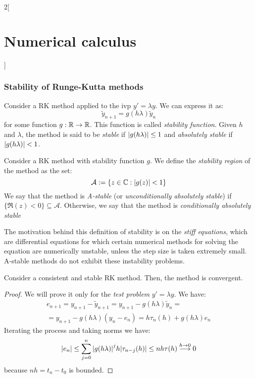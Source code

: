 \documentclass[../../../main_math.tex]{subfiles}
\begin{document}
\begin{multicols}{2}[\section{Numerical calculus}]
  \subsubsection{Stability of Runge-Kutta methods}
  \begin{definition}
    Consider a RK method applied to the ivp $y'=\lambda y$. We can express it as:
    $$
      \tilde{y}_{n+1}=g(h\lambda)\tilde{y}_n
    $$
    for some function $g:\mathbb{R}\rightarrow\mathbb{R}$. This function is called \emph{stability function}. Given $h$ and $\lambda$, the method is said to be \emph{stable} if $\abs{g(h\lambda)}\leq 1$ and \emph{absolutely stable} if $\abs{g(h\lambda)}< 1$.
  \end{definition}
  \begin{definition}
    Consider a RK method with stability function $g$. We define the \emph{stability region} of the method as the set:
    $$
      \mathcal{A}:=\{z\in\mathbb{C}:\abs{g(z)}< 1\}
    $$
    We say that the method is \emph{A-stable} (or \emph{unconditionally absolutely stable}) if $\{\Re(z)<0\}\subseteq \mathcal{A}$. Otherwise, we say that the method is \emph{conditionally absolutely stable}
  \end{definition}
  \begin{remark}
    The motivation behind this definition of stability is on the \emph{stiff equations}, which are differential equations for which certain numerical methods for solving the equation are numerically unstable, unless the step size is taken extremely small. A-stable methods do not exhibit these instability problems.
  \end{remark}
  \begin{theorem}
    Consider a consistent and stable RK method. Then, the method is convergent.
  \end{theorem}
  \begin{proof}
    We will prove it only for the \emph{test problem} $y'=\lambda y$. We have:
    \begin{multline*}
      e_{n+1}={y}_{n+1}-{\tilde{y}}_{n+1}={y}_{n+1}-g(h\lambda){\tilde{y}}_n=\\
      ={y}_{n+1}-g(h\lambda)({y}_n-e_n)=h{\tau}_n(h)+g(h\lambda)e_n
    \end{multline*}
    Iterating the process and taking norms we have:
    $$
      \abs{{e}_n}\leq\sum_{j=0}^n{\abs{g(h\lambda)}}^jh\abs{{\tau}_{n-j}(h)}\leq nh\tau(h)\overset{h\to 0}{\longrightarrow}0
    $$
    because $nh=t_n-t_0$ is bounded.
  \end{proof}

\end{multicols}
\end{document}
